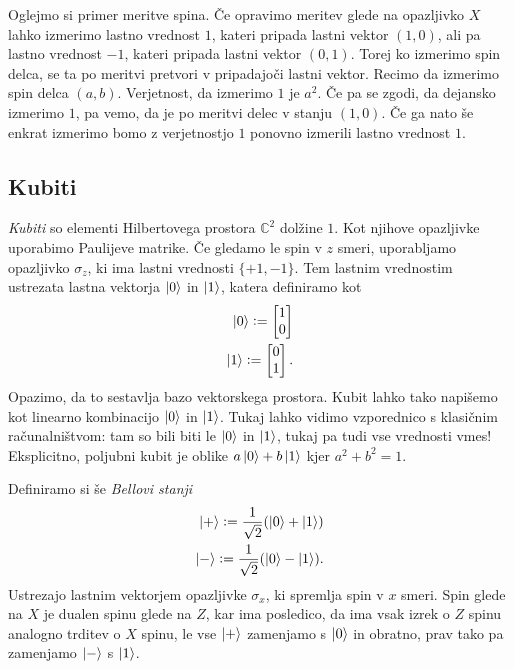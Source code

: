 \documentclass[mat1]{fmfdelo}
\newcommand{\defeq}{\vcentcolon=}
\begin{document}
Oglejmo si primer meritve spina. Če opravimo meritev glede na opazljivko \(X\) lahko izmerimo lastno vrednost \(1\), kateri pripada lastni vektor \((1,0)\), ali pa lastno vrednost \(-1\), kateri pripada lastni vektor \((0,1)\). Torej ko izmerimo spin delca, se ta po meritvi pretvori v pripadajoči lastni vektor. Recimo da izmerimo spin delca \((a,b)\). Verjetnost, da izmerimo \(1\) je \(a^2\). Če pa se zgodi, da dejansko izmerimo \(1\), pa vemo, da je po meritvi delec v stanju \((1,0)\). Če ga nato še enkrat izmerimo bomo z verjetnostjo \(1\) ponovno izmerili lastno vrednost \(1\).
\subsection{Kubiti}
\emph{Kubiti} so elementi Hilbertovega prostora \(\mathbb C^2\) dolžine \(1\). Kot njihove opazljivke uporabimo Paulijeve matrike. Če gledamo le spin v \(z\) smeri, uporabljamo opazljivko \(\sigma_z\), ki ima lastni vrednosti \(\{+1, -1\}\). Tem lastnim vrednostim ustrezata lastna vektorja \(\ket0\) in \(\ket1\), katera definiramo kot
\begin{align*}
    \ket0 \defeq \begin{bmatrix}
        1\\0
    \end{bmatrix}\\
    \ket1 \defeq \begin{bmatrix}
        0\\1
    \end{bmatrix}.
\end{align*}
Opazimo, da to sestavlja bazo vektorskega prostora. Kubit lahko tako napišemo kot linearno kombinacijo \(\ket0\) in \(\ket1\). Tukaj lahko vidimo vzporednico s klasičnim računalništvom: tam so bili biti le \(\ket0\) in \(\ket1\), tukaj pa tudi vse vrednosti vmes! Eksplicitno, poljubni kubit je oblike \(a\ket0+b\ket1\) kjer \(a^2+b^2=1\).

Definiramo si še \emph{Bellovi stanji}
\begin{align*}
    \ket{+} \defeq \frac{1}{\sqrt2} (\ket0+\ket1)\\
    \ket{-} \defeq \frac{1}{\sqrt2} (\ket0-\ket1).
\end{align*}
Ustrezajo lastnim vektorjem opazljivke \(\sigma_x\), ki spremlja spin v \(x\) smeri. Spin glede na \(X\) je dualen spinu glede na \(Z\), kar ima posledico, da ima vsak izrek o \(Z\) spinu analogno trditev o \(X\) spinu, le vse \(\ket+\) zamenjamo s \(\ket0\) in obratno, prav tako pa zamenjamo \(\ket-\) s \(\ket1\).
\end{document}
